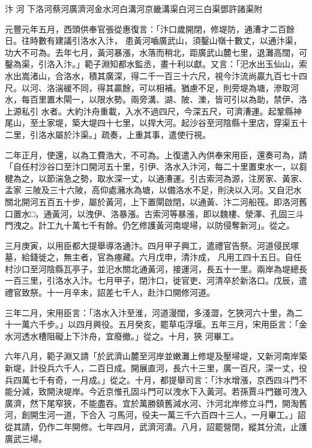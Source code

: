 
\begin{pinyinscope}

 汴
 河
 下洛河蔡河廣濟河金水河白溝河京畿溝渠白河三白渠鄧許諸渠附



 元豐元年五月，西頭供奉官張從惠復言：「汴口歲開閉，修堤防，通漕才二百餘日。往時數有建議引洛水入汴，
 患黃河嚙廣武山，須鑿山嶺十數丈，以通汴渠，功大不可為。去年七月，黃河暴漲，水落而稍北，距廣武山麓七里，退灘高闊，可鑿為渠，引洛入汴。」範子淵知都水監丞，畫十利以獻。又言：「汜水出玉仙山，索水出嵩渚山，合洛水，積其廣深，得二千一百三十六尺，視今汴流尚贏九百七十四尺。以河、洛湍緩不同，得其贏餘，可以相補。猶慮不足，則旁堤為塘，滲取河水，每百里置木閘一，以限水勢。兩旁溝、湖、陂、濼，皆可引以為助，禁伊、洛上源私引
 水者。大約汴舟重載，入水不過四尺，今深五尺，可濟漕運。起鞏縣神尾山，至土家堤，築大堤四十七里，以捍大河。起沙谷至河陰縣十里店，穿渠五十二里，引洛水屬於汴渠。」疏奏，上重其事，遣使行視。



 二年正月，使還，以為工費浩大，不可為。上復遣入內供奉宋用臣，還奏可為，請「自任村沙谷口至汴口開河五十里，引伊、洛水入汴河，每二十里置束水一，以芻楗為之，以節湍急之勢，取水深一丈，以通漕運。引古索河為源，注房家、黃家、孟家
 三陂及三十六陂，高仰處瀦水為塘，以備洛水不足，則決以入河。又自汜水關北開河五百五十步，屬於黃河，上下置閘啟閉，以通黃、汴二河船筏。即洛河舊口置水□，通黃河，以洩伊、洛暴漲。古索河等暴漲，即以魏樓、滎澤、孔固三斗門洩之。計工九十萬七千有餘。仍乞修護黃河南堤埽，以防侵奪新河」。從之。



 三月庚寅，以用臣都大提舉導洛通汴。四月甲子興工，遣禮官告祭。河道侵民塚墓，給錢徙之，無主者，官為瘞藏。六月戊申，清汴成，
 凡用工四十五日。自任村沙口至河陰縣瓦亭子，並汜水關北通黃河，接運河，長五十一里。兩岸為堤總長一百三里，引洛水入汴。七月甲子，閉汴口，徙官吏、河清卒於新洛口。戊辰，遣禮官致祭。十一月辛未，詔差七千人，赴汴口開修河道。



 三年二月，宋用臣言：「洛水入汴至淮，河道漫闊，多淺澀，乞狹河六十里，為二十一萬六千步。」以四月興役。五月癸亥，罷草屯浮堰。五年三月，宋用臣言：「金水河透水槽阻礙上下汴舟，宜廢撤。」從之。十月，狹
 河畢工。



 六年八月，範子淵又請「於武濟山麓至河岸並嫩灘上修堤及壓埽堤，又新河南岸築新堤，計役兵六千人，二百日成。開展直河，長六十三里，廣一百尺，深一丈，役兵四萬七千有奇，一月成。」從之。十月，都提舉司言：「汴水增漲，京西四斗門不能分減，致開決堤岸。今近京惟孔固斗門可以洩水下入黃河。若孫賈斗門雖可洩入廣濟，然下尾窄狹，不能盡吞。宜於萬勝鎮舊減水河、汴河北岸修立斗門，開淘舊河，創開生河一道，下合入
 刁馬河，役夫一萬三千六百四十三人，一月畢工。」詔從其請，仍作二年開修。七年四月，武濟河潰。八月，詔罷營閉，縱其分流，止護廣武三埽。




\end{pinyinscope}
